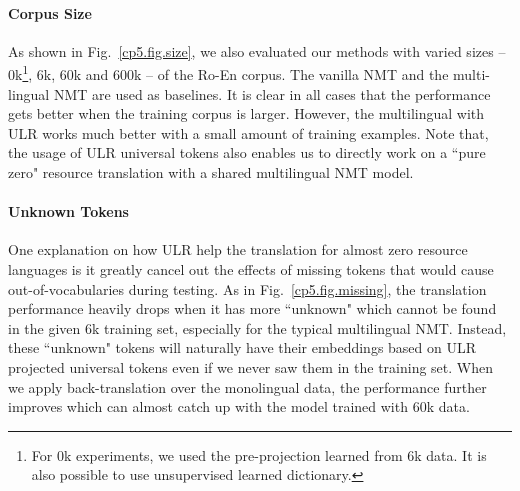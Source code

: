 \paragraph{Corpus Size}
As shown in Fig.~\ref{cp5.fig.size}, we also evaluated our methods with varied  sizes -- 0k\footnote{For 0k experiments, we used the pre-projection learned from 6k data. It is also possible to use unsupervised learned dictionary.}, 6k, 60k and 600k -- of the Ro-En corpus. The vanilla NMT and the multi-lingual NMT are used as baselines. It is clear in  all cases that the performance gets better when the training corpus is larger. However, the multilingual with ULR works much better with a small amount of training examples. Note that, the usage of ULR universal tokens also enables us to directly work on a ``pure zero" resource translation with a shared multilingual NMT model. 

\paragraph{Unknown Tokens}
One explanation on how ULR help the translation for almost zero resource languages is it greatly cancel out the effects of missing tokens that would cause out-of-vocabularies during testing. As in Fig.~\ref{cp5.fig.missing}, the translation performance heavily drops when it has more ``unknown" which cannot be found in the given 6k training set, especially for the typical multilingual NMT.  Instead, these ``unknown" tokens will naturally have their embeddings based on ULR  projected universal tokens even if we never saw them in the training set. When we apply back-translation over the monolingual data, the performance  further improves which can almost catch up with the model trained with 60k data. %





